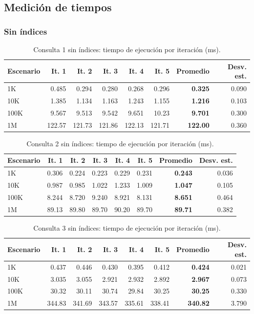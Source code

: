 \documentclass[11pt,letterpaper]{article}
\begin{document}
\subsection{Medición de tiempos}

\subsubsection{Sin índices}

\begin{table}[H]
\centering\small
\begin{tabular}{lrrrrrrr}
\toprule
Escenario & It. 1 & It. 2 & It. 3 & It. 4 & It. 5 & Promedio & Desv. est. \\
\midrule
1K & 0.485 & 0.294 & 0.280 & 0.268 & 0.296 & \textbf{0.325} & 0.090 \\
10K & 1.385 & 1.134 & 1.163 & 1.243 & 1.155 & \textbf{1.216} & 0.103 \\
100K & 9.567 & 9.513 & 9.542 & 9.651 & 10.23 & \textbf{9.701} & 0.300 \\
1M & 122.57 & 121.73 & 121.86 & 122.13 & 121.71 & \textbf{122.00} & 0.360 \\
\bottomrule
\end{tabular}
\caption{Consulta 1 sin índices: tiempo de ejecución por iteración (ms).}\label{tab:sin1}
\end{table}

\begin{table}[H]
\centering\small
\begin{tabular}{lrrrrrrr}
\toprule
Escenario & It. 1 & It. 2 & It. 3 & It. 4 & It. 5 & Promedio & Desv. est. \\
\midrule
1K & 0.306 & 0.224 & 0.223 & 0.229 & 0.231 & \textbf{0.243} & 0.036 \\
10K & 0.987 & 0.985 & 1.022 & 1.233 & 1.009 & \textbf{1.047} & 0.105 \\
100K & 8.244 & 8.720 & 9.240 & 8.921 & 8.131 & \textbf{8.651} & 0.464 \\
1M & 89.13 & 89.80 & 89.70 & 90.20 & 89.70 & \textbf{89.71} & 0.382 \\
\bottomrule
\end{tabular}
\caption{Consulta 2 sin índices: tiempo de ejecución por iteración (ms).}\label{tab:sin2}
\end{table}

\begin{table}[H]
\centering\small
\begin{tabular}{lrrrrrrr}
\toprule
Escenario & It. 1 & It. 2 & It. 3 & It. 4 & It. 5 & Promedio & Desv. est. \\
\midrule
1K & 0.437 & 0.446 & 0.430 & 0.395 & 0.412 & \textbf{0.424} & 0.021 \\
10K & 3.035 & 3.055 & 2.921 & 2.932 & 2.892 & \textbf{2.967} & 0.073 \\
100K & 30.32 & 30.11 & 30.74 & 29.84 & 30.25 & \textbf{30.25} & 0.330 \\
1M & 344.83 & 341.69 & 343.57 & 335.61 & 338.41 & \textbf{340.82} & 3.790 \\
\bottomrule
\end{tabular}
\caption{Consulta 3 sin índices: tiempo de ejecución por iteración (ms).}\label{tab:sin3}
\end{table}
\end{document}

